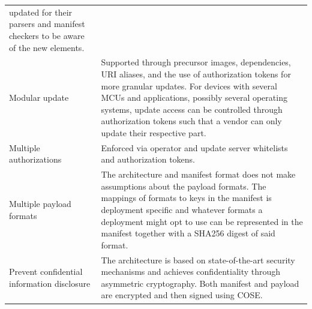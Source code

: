 \documentclass[0-thesis.tex]{subfiles}
\begin{document}
\begin{longtable}[]{@{}ll@{}}
\begin{minipage}[t]{0.53\columnwidth}
    updated for their parsers and manifest checkers to be aware of the new
    elements.\strut
    \end{minipage}\tabularnewline
    \begin{minipage}[t]{0.41\columnwidth}\raggedright\strut
    Modular update\strut
    \end{minipage} & \begin{minipage}[t]{0.53\columnwidth}\raggedright\strut
    Supported through precursor images, dependencies, URI aliases, and the
    use of authorization tokens for more granular updates. For devices with
    several MCUs and applications, possibly several operating systems,
    update access can be controlled through authorization tokens such that a
    vendor can only update their respective part.\strut
    \end{minipage}\tabularnewline
    \begin{minipage}[t]{0.41\columnwidth}\raggedright\strut
    Multiple authorizations\strut
    \end{minipage} & \begin{minipage}[t]{0.53\columnwidth}\raggedright\strut
    Enforced via operator and update server whitelists and authorization
    tokens.\strut
    \end{minipage}\tabularnewline
    \begin{minipage}[t]{0.41\columnwidth}\raggedright\strut
    Multiple payload formats\strut
    \end{minipage} & \begin{minipage}[t]{0.53\columnwidth}\raggedright\strut
    The architecture and manifest format does not make assumptions about the
    payload formats. The mappings of formats to keys in the manifest is
    deployment specific and whatever formats a deployment might opt to use
    can be represented in the manifest together with a SHA256 digest of said
    format.\strut
    \end{minipage}\tabularnewline
    \begin{minipage}[t]{0.41\columnwidth}\raggedright\strut
    Prevent confidential information disclosure\strut
    \end{minipage} & \begin{minipage}[t]{0.53\columnwidth}\raggedright\strut
    The architecture is based on state-of-the-art security mechanisms and
    achieves confidentiality through asymmetric cryptography. Both manifest
    and payload are encrypted and then signed using COSE.\strut
    \end{minipage}\tabularnewline

\end{longtable}
\end{document}
